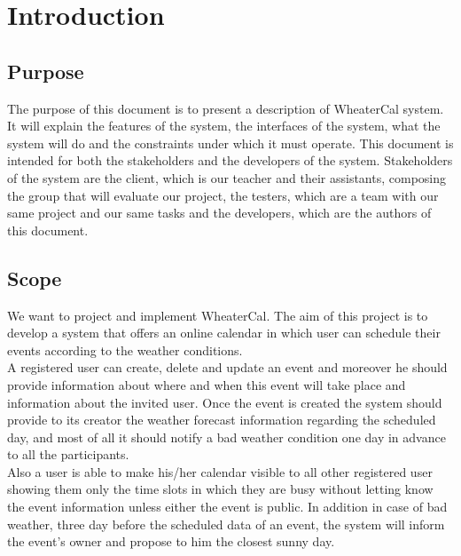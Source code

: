 \chapter{Introduction} \label{cap:cap1}

\section{Purpose}
The purpose of this document is to present a description of WheaterCal system. It will explain the features of the system, the interfaces of the system, what the system will do and the constraints under which it must operate.
This document is intended for both the stakeholders and the developers of the system.
Stakeholders of the system are the client, which is our teacher and their assistants, composing the group that will evaluate our project, the testers, which are a team with our same project and our same tasks and the developers, which are the authors of this document.

\section{Scope}
We want to project and implement WheaterCal. The aim of this project is to develop a system that offers an online calendar in which user can schedule their events according to the weather conditions.\\ A registered user can create, delete and update an event and moreover he should provide information about where and when this event will take place and information about the invited user.
Once the event is created the system should provide to its creator the weather forecast information regarding the scheduled day, and most of all it should notify a bad weather condition one day in advance to all the participants.\\
Also a user is able to make his/her calendar visible to all other registered user showing them only the time slots in which they are busy without letting know the event information unless either the event is public.
In addition in case of bad weather, three day before the scheduled data of an event, the system will inform the event's owner and propose to him the closest sunny day.

